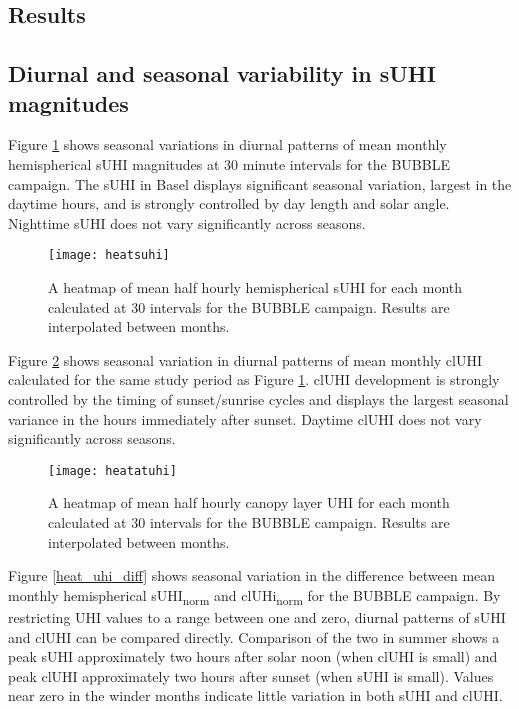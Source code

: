 \begin{bibunit}
\section{Results}

\subsection{Diurnal and seasonal variability in sUHI magnitudes}

Figure \ref{heatsuhi} shows seasonal variations in diurnal patterns of mean monthly hemispherical sUHI magnitudes at 30 minute intervals for the BUBBLE campaign. The sUHI in Basel displays significant seasonal variation, largest in the daytime hours, and is strongly controlled by day length and solar angle. Nighttime sUHI does not vary significantly across seasons. 

\begin{figure}[H]
	\centering
	\texttt{[image: heatsuhi]}
	\caption{A heatmap of mean half hourly hemispherical sUHI for each month calculated at 30 \si{\min} intervals for the BUBBLE campaign. Results are interpolated between months.}
	\label{heatsuhi}
\end{figure}

Figure \ref{heatcluhi} shows seasonal variation in diurnal patterns of mean monthly clUHI calculated for the same study period as Figure \ref{heatsuhi}. clUHI development is strongly controlled by the timing of sunset/sunrise cycles and displays the largest seasonal variance in the hours immediately after sunset. Daytime clUHI does not vary significantly across seasons. 

\begin{figure}[H]
	\centering
	\texttt{[image: heatatuhi]}
	\caption{A heatmap of mean half hourly canopy layer UHI for each month calculated at 30 \si{\min} intervals for the BUBBLE campaign. Results are interpolated between months.}
	\label{heatcluhi}
\end{figure}

Figure \ref{heat_uhi_diff} shows seasonal variation in the difference between mean monthly hemispherical sUHI\textsubscript{norm} and clUHi\textsubscript{norm} for the BUBBLE campaign. By restricting UHI values to a range between one and zero, diurnal patterns of sUHI and clUHI can be compared directly. Comparison of the two in summer shows a peak sUHI approximately two hours after solar noon (when clUHI is small) and peak clUHI approximately two hours after sunset (when sUHI is small). Values near zero in the winder months indicate little variation in both sUHI and clUHI.


\end{bibunit}
